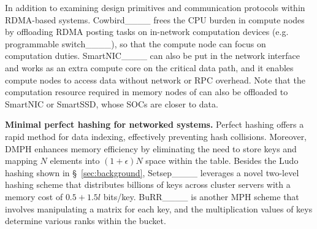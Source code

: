 
In addition to examining design primitives and communication protocols within RDMA-based systems.
Cowbird____ frees the CPU burden in compute nodes by offloading RDMA posting tasks on in-network computation devices (e.g. programmable switch____), so that the compute node can focus on computation duties. 
SmartNIC____ can also be put in the network interface and works as an extra compute core on the critical data path, and it enables compute nodes to access data without network or RPC overhead. 
Note that the computation resource required in memory nodes of \sys can also be offloaded to SmartNIC or SmartSSD, whose SOCs are closer to data. 

\textbf{Minimal perfect hashing for networked systems.} 
Perfect hashing offers a rapid method for data indexing, effectively preventing hash collisions. Moreover, DMPH enhances memory efficiency by eliminating the need to store keys and mapping $N$ elements into $(1+\epsilon)N$ space within the table.
Besides the Ludo hashing shown in \S ~\ref{sec:background}, Setsep____ leverages a novel two-level hashing scheme that distributes billions of keys across cluster servers with a memory cost of $0.5+1.5l$ bits/key. 
BuRR____ is another MPH scheme that involves manipulating a matrix for each key, and the multiplication values of keys determine various ranks within the bucket.

